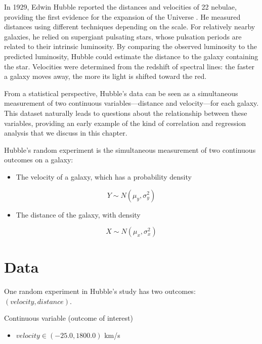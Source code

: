 \documentclass[
]{book}
\providecommand{\tightlist}{%
  \setlength{\itemsep}{0pt}\setlength{\parskip}{0pt}}
\begin{document}
In 1929, Edwin Hubble reported the distances and velocities of 22 nebulae, providing the first evidence for the expansion of the Universe \citep{Hubble1929_distance_velocity}. He measured distances using different techniques depending on the scale. For relatively nearby galaxies, he relied on supergiant pulsating stars, whose pulsation periods are related to their intrinsic luminosity. By comparing the observed luminosity to the predicted luminosity, Hubble could estimate the distance to the galaxy containing the star. Velocities were determined from the redshift of spectral lines: the faster a galaxy moves away, the more its light is shifted toward the red.

From a statistical perspective, Hubble's data can be seen as a simultaneous measurement of two continuous variables---distance and velocity---for each galaxy. This dataset naturally leads to questions about the relationship between these variables, providing an early example of the kind of correlation and regression analysis that we discuss in this chapter.

Hubble's random experiment is the simultaneous measurement of two continuous outcomes on a galaxy:

\begin{itemize}
\tightlist
\item
  The velocity of a galaxy, which has a probability density
\end{itemize}

\[Y \sim N(\mu_y, \sigma_y^2)\]

\begin{itemize}
\tightlist
\item
  The distance of the galaxy, with density
\end{itemize}

\[X \sim N(\mu_x, \sigma_x^2)\]

\hypertarget{data-6}{%
\section{Data}\label{data-6}}

One random experiment in Hubble's study has two outcomes: \((velocity, distance)\).

Continuous variable (outcome of interest)

\begin{itemize}
\tightlist
\item
  \(velocity \in (-25.0, 1800.0)\) km/s
\end{itemize}
\end{document}
